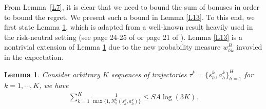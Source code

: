 \documentclass[11pt]{article}
\newtheorem{lemma}{Lemma}
\newcommand{\1}{\mathbbm{1}}
\newcommand{\gao}[1]{\textcolor{blue}{{#1}}} %
\begin{document}
From Lemma~\ref{L7}, it is clear that we need to bound the sum of bonuses in order to bound the regret. We present such a bound in Lemma \ref{L13}. To this end, we first state Lemma \ref{LP13}, which is adapted from a well-known result heavily used in the risk-neutral setting (see page 24-25 of \cite{azar2017minimax} or page 21 of \cite{jin2018q}). Lemma \ref{L13} is a nontrivial extension of Lemma \ref{LP13} due to the new probability measure $w_{hk}^{B}$ invovled in the expectation. 


\begin{lemma}\label{LP13}
Consider arbitrary $K$ sequences of trajectories $\tau^k=\{s_h^k,a_h^k\}_{h=1}^H$ for $k=1,\cdots,K$, we have
\begin{align*}
\sum_{k=1}^K\frac{1}{\max\{1,N_h^k(s_h^k,a_h^k)\}}\leq  SA\log(3K).
\end{align*}
\end{lemma}
\end{document}
